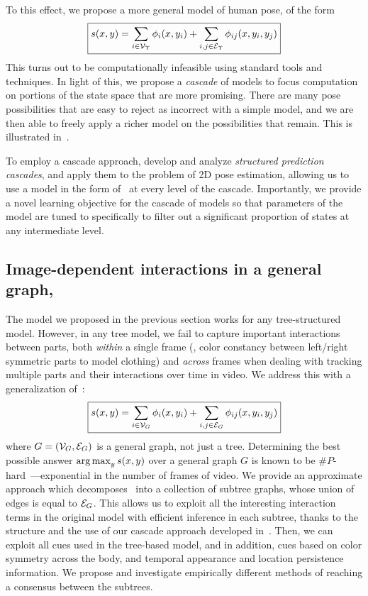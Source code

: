 To this effect, we propose a more general model of human pose, of the form 
\begin{equation}
\boxed{s(x,y) =  \sum_{i \in \mathcal{V}_{\Upsilon}} \phi_i(x,y_i) + \sum_{i,j \in 
\mathcal{E}_{\Upsilon}} \phi_{ij}(x,y_i,y_j)}
\label{eq:contrib1}
\end{equation}
This turns out to be computationally infeasible using standard tools and 
techniques.  In light of this, we propose a {\em cascade} of models to focus 
computation on portions of the state space that are more promising. There are 
many pose possibilities that are easy to reject as incorrect with a simple 
model, and we are then able to freely apply a richer model on the possibilities 
that remain.  This is illustrated in~.

To employ a cascade approach, develop and analyze {\em structured prediction 
cascades}, and apply them to the problem of 2D pose estimation, allowing us to 
use a model in the form of~ at every level of the cascade.  
Importantly, we provide a novel learning objective for the cascade of models so 
that parameters of the model are tuned to specifically to filter out a 
significant proportion of states at any intermediate level. 

\subsection{Image-dependent interactions in a general 
graph,~}
The model we proposed in the previous section works for any tree-structured 
model.  However, in any tree model, we fail to capture important interactions 
between parts, both {\em within} a single frame (\eg, color constancy between 
left/right symmetric parts to model clothing) and {\em across} frames when 
dealing with tracking multiple parts and their interactions over time in video.  
We address this with a generalization of~:
\begin{equation}
\boxed{s(x,y) =  \sum_{i \in \mathcal{V}_{G}} \phi_i(x,y_i) + \sum_{i,j \in \mathcal{E}_{G}} 
\phi_{ij}(x,y_i,y_j)}
\label{eq:contrib2}
\end{equation}
where $G = (\mathcal{V}_G,\mathcal{E}_G)$ is a general graph, not just a tree.  Determining the 
best possible answer $\mathop{\arg\max}_y s(x,y)$ over a general graph $G$ is known to be 
$\#P$-hard~\citep{koller-book}---exponential in the number of frames of video.  
We provide an approximate approach which decomposes~ into a 
collection of subtree graphs, whose union of edges is equal to $\mathcal{E}_G$.  This 
allows us to exploit all the interesting interaction terms in the original 
model with efficient inference in each subtree, thanks to the structure and the 
use of our cascade approach developed in~.  Then, we can 
exploit all cues used in the tree-based model, and in addition, cues based on 
color symmetry across the body, and temporal appearance and location 
persistence information.  We propose and investigate empirically different 
methods of reaching a consensus between the subtrees.

